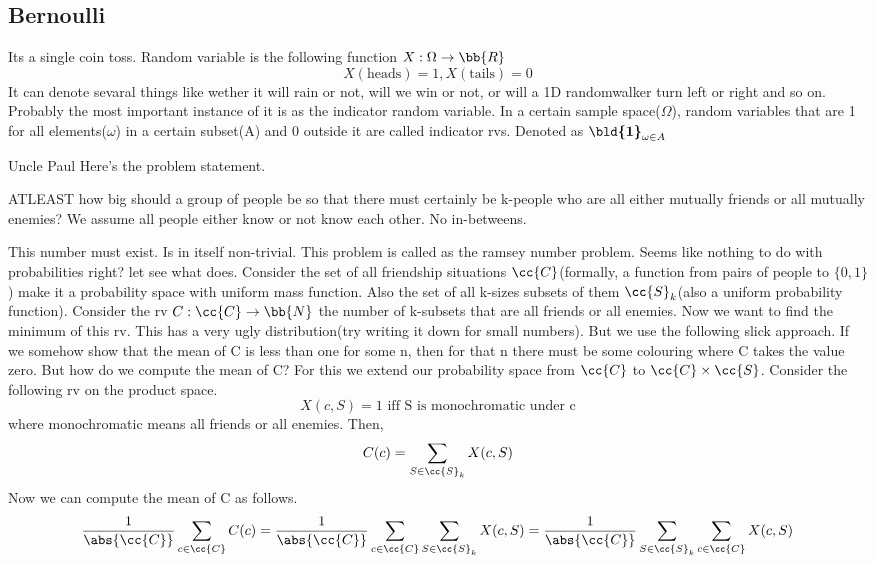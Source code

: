 \documentclass{myclass}
\begin{document}
\subsection*{Bernoulli}
Its a single coin toss. Random variable is the following function $X:\Omega\to\bb{R}$
$$X(\text{heads})=1,X(\text{tails})=0$$
It can denote sevaral things like wether it will rain or not, will we win or not, or will a 1D randomwalker turn left or right and so on. Probably the most important instance of it is as the indicator random variable.
In a certain sample space($\Omega$), random variables that are 1 for all elements($\omega$) in a certain subset(A) and 0 outside it are called indicator rvs. Denoted as $\boldsymbol{\bld{1}}_{\omega\in A}$
\begin{yellowbox}{Uncle Paul}
    Here's the problem statement.
    \begin{center}
        ATLEAST how big should a group of people be so that there must certainly be k-people who are all either mutually friends or all mutually enemies?
        We assume all people either know or not know each other. No in-betweens.
    \end{center}
    This number must exist. Is in itself non-trivial. This problem is called as the ramsey number problem. Seems like nothing to do with probabilities right? let see what  does.
    Consider the set of all friendship situations $\cc{C}$(formally, a function from pairs of people to $\{0,1\}$) make it a probability space with uniform mass function. Also the set of all k-sizes subsets of them $\cc{S}_k$(also a uniform probability function). Consider the rv $C:\cc{C}\to \bb{N}$ the number of k-subsets that are all friends or all enemies. Now we want to find the minimum of this rv.
    This has a very ugly distribution(try writing it down for small numbers). But we use the following slick approach. If we somehow show that the mean of C is less than one for some n, then for that n there must be some colouring where C takes the value zero. But how do we compute the mean of C? For this we extend our probability space from $\cc{C}$ to $\cc{C}\times\cc{S}$. Consider the following rv on the product space.
    $$X(c,S)=1 \text{ iff S is monochromatic under c}$$
    where monochromatic means all friends or all enemies.
    Then, $$C(c)=\sum_{S\in\cc{S}_k}X(c,S)$$
    Now we can compute the mean of C as follows.
    $$\frac{1}{\abs{\cc{C}}}\sum_{c\in \cc{C}}C(c)=\frac{1}{\abs{\cc{C}}}\sum_{c\in \cc{C}}\sum_{S\in\cc{S}_k}X(c,S)=\frac{1}{\abs{\cc{C}}}\sum_{S\in\cc{S}_k}\sum_{c\in \cc{C}}X(c,S)$$

\end{yellowbox}
\end{document}
